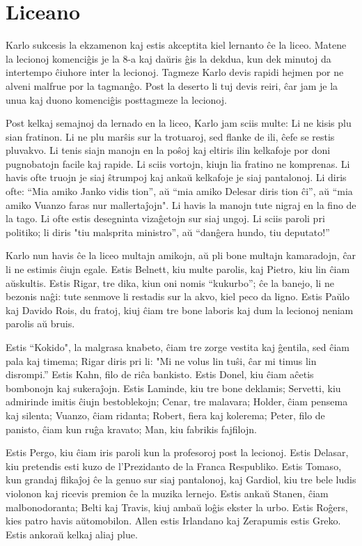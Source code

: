 \chapter{Liceano}

Karlo sukcesis la ekzamenon kaj estis akceptita kiel lernanto ĉe la liceo. Matene la lecionoj komenciĝis je la 8-a kaj daŭris ĝis la dekdua, kun dek minutoj da intertempo ĉiuhore inter la lecionoj. Tagmeze Karlo devis rapidi hejmen por ne alveni malfrue por la tagmanĝo. Post la deserto li tuj devis reiri, ĉar jam je la unua kaj duono komenciĝis posttagmeze la lecionoj.

Post kelkaj semajnoj da lernado en la liceo, Karlo jam sciis multe: Li ne kisis plu sian fratinon. Li ne plu marŝis sur la trotuaroj, sed flanke de ili, ĉefe se restis pluvakvo. Li tenis siajn manojn en la poŝoj kaj eltiris ilin kelkafoje por doni pugnobatojn facile kaj rapide. Li sciis vortojn, kiujn lia fratino ne komprenas. Li havis ofte truojn je siaj ŝtrumpoj kaj ankaŭ kelkafoje je siaj pantalonoj. Li diris ofte: ``Mia amiko Janko vidis tion'', aŭ ``mia amiko Delesar diris tion ĉi'', aŭ ``mia amiko Vuanzo faras nur mallertaĵojn". Li havis la manojn tute nigraj en la fino de la tago. Li ofte estis desegninta vizaĝetojn sur siaj ungoj. Li sciis paroli pri politiko; li diris "tiu malsprita ministro'', aŭ ``danĝera hundo, tiu deputato!''

Karlo nun havis ĉe la liceo multajn amikojn, aŭ pli bone multajn kamaradojn, ĉar li ne estimis ĉiujn egale. Estis Belnett, kiu multe parolis, kaj Pietro, kiu lin ĉiam aŭskultis. Estis Rigar, tre dika, kiun oni nomis ``kukurbo''; ĉe la banejo, li ne bezonis naĝi: tute senmove li restadis sur la akvo, kiel peco da ligno. Estis Paŭlo kaj Davido Rois, du fratoj, kiuj ĉiam tre bone laboris kaj dum la lecionoj neniam parolis aŭ bruis.

Estis ``Kokido", la malgrasa knabeto, ĉiam tre zorge vestita kaj ĝentila, sed ĉiam pala kaj timema; Rigar diris pri li: "Mi ne volus lin tuŝi, ĉar mi timus lin disrompi.'' Estis Kahn, filo de riĉa bankisto. Estis Donel, kiu ĉiam aĉetis bombonojn kaj sukeraĵojn. Estis Laminde, kiu tre bone deklamis; Servetti, kiu admirinde imitis ĉiujn bestoblekojn; Cenar, tre malavara; Holder, ĉiam pensema kaj silenta; Vuanzo, ĉiam ridanta; Robert, fiera kaj kolerema; Peter, filo de panisto, ĉiam kun ruĝa kravato; Man, kiu fabrikis fajfilojn.

Estis Pergo, kiu ĉiam iris paroli kun la profesoroj post la lecionoj. Estis Delasar, kiu pretendis esti kuzo de l'Prezidanto de la Franca Respubliko. Estis Tomaso, kun grandaj flikaĵoj ĉe la genuo sur siaj pantalonoj, kaj Gardiol, kiu tre bele ludis violonon kaj ricevis premion ĉe la muzika lernejo. Estis ankaŭ Stanen, ĉiam malbonodoranta; Belti kaj Travis, kiuj ambaŭ loĝis ekster la urbo. Estis Roĝers, kies patro havis aŭtomobilon. Allen estis Irlandano kaj Zerapumis estis Greko. Estis ankoraŭ kelkaj aliaj plue.

